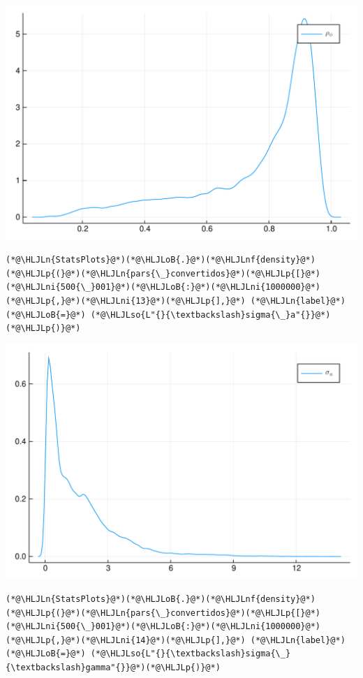 \documentclass[12pt,a4paper]{article}
\newcommand{\HLJLn}[1]{#1}
\newcommand{\HLJLnf}[1]{\textcolor[RGB]{66,102,213}{#1}}
\newcommand{\HLJLso}[1]{\textcolor[RGB]{201,61,57}{#1}}
\newcommand{\HLJLni}[1]{\textcolor[RGB]{59,151,46}{#1}}
\newcommand{\HLJLoB}[1]{\textcolor[RGB]{102,102,102}{\textbf{#1}}}
\newcommand{\HLJLp}[1]{#1}
\begin{document}
\includegraphics[width=\linewidth]{figures/carlos_mcmc_13_1.pdf}

\begin{lstlisting}
(*@\HLJLn{StatsPlots}@*)(*@\HLJLoB{.}@*)(*@\HLJLnf{density}@*)(*@\HLJLp{(}@*)(*@\HLJLn{pars{\_}convertidos}@*)(*@\HLJLp{[}@*)(*@\HLJLni{500{\_}001}@*)(*@\HLJLoB{:}@*)(*@\HLJLni{1000000}@*)(*@\HLJLp{,}@*)(*@\HLJLni{13}@*)(*@\HLJLp{],}@*) (*@\HLJLn{label}@*)(*@\HLJLoB{=}@*) (*@\HLJLso{L"{}{\textbackslash}sigma{\_}a"{}}@*)(*@\HLJLp{)}@*)
\end{lstlisting}

\includegraphics[width=\linewidth]{figures/carlos_mcmc_14_1.pdf}

\begin{lstlisting}
(*@\HLJLn{StatsPlots}@*)(*@\HLJLoB{.}@*)(*@\HLJLnf{density}@*)(*@\HLJLp{(}@*)(*@\HLJLn{pars{\_}convertidos}@*)(*@\HLJLp{[}@*)(*@\HLJLni{500{\_}001}@*)(*@\HLJLoB{:}@*)(*@\HLJLni{1000000}@*)(*@\HLJLp{,}@*)(*@\HLJLni{14}@*)(*@\HLJLp{],}@*) (*@\HLJLn{label}@*)(*@\HLJLoB{=}@*) (*@\HLJLso{L"{}{\textbackslash}sigma{\_}{\textbackslash}gamma"{}}@*)(*@\HLJLp{)}@*)
\end{lstlisting}
\end{document}
